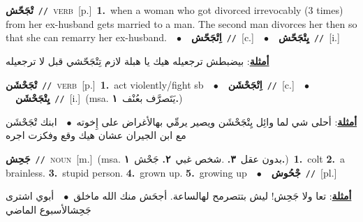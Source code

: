 \documentclass[10pt,a4paper,twoside]{article} %
\begin{document}
\begin{multicols}{2}
{\setlength\topsep{0pt}\textbf{\foreignlanguage{arabic}{تْجَحّش}}\ {\color{gray}\texttt{//}\color{black}}\ \textsc{verb}\ [p.]\ \textbf{1.}~when a woman who got divorced irrevocably (3 times) from her ex-husband gets married to a man. The second man divorces her then so that she can remarry her ex-husband.\ \ $\bullet$\ \ \setlength\topsep{0pt}\textbf{\foreignlanguage{arabic}{اِتْجَحّش}}\ {\color{gray}\texttt{//}\color{black}}\ [c.]\ \ $\bullet$\ \ \setlength\topsep{0pt}\textbf{\foreignlanguage{arabic}{يِتْجَحّش}}\ {\color{gray}\texttt{//}\color{black}}\ [i.]\  \begin{flushright}\color{gray}\foreignlanguage{arabic}{\textbf{\underline{\foreignlanguage{arabic}{أمثلة}}}: بيضبطش ترجعيله هيك يا هبلة لازم تِتْجَحّشي قبل لا ترجعيله}\end{flushright}\color{black}} \vspace{2mm}

{\setlength\topsep{0pt}\textbf{\foreignlanguage{arabic}{تْجَحْشَن}}\ {\color{gray}\texttt{//}\color{black}}\ \textsc{verb}\ [p.]\ \textbf{1.}~act violently/fight sb\ \ $\bullet$\ \ \setlength\topsep{0pt}\textbf{\foreignlanguage{arabic}{اِتْجَحْشَن}}\ {\color{gray}\texttt{//}\color{black}}\ [c.]\ \ $\bullet$\ \ \setlength\topsep{0pt}\textbf{\foreignlanguage{arabic}{يِتْجَحْشَن}}\ {\color{gray}\texttt{//}\color{black}}\ [i.]\ \color{gray}(msa. \foreignlanguage{arabic}{يَتَصرَّف بعُنْف}~\foreignlanguage{arabic}{\textbf{١.}})\color{black}\  \begin{flushright}\color{gray}\foreignlanguage{arabic}{\textbf{\underline{\foreignlanguage{arabic}{أمثلة}}}: أحلى شي لما وائِل يِتْجَحْشَن ويصير يرمِّي بهالأغراض على إِخوته\ $\bullet$\ \  ابنك تْجَحْشَن مع ابن الجيران عشان هيك وقع وفكزت اجره}\end{flushright}\color{black}} \vspace{2mm}

{\setlength\topsep{0pt}\textbf{\foreignlanguage{arabic}{جَحِش}}\ {\color{gray}\texttt{//}\color{black}}\ \textsc{noun}\ [m.]\ \color{gray}(msa. \foreignlanguage{arabic}{بدون عقل}~\foreignlanguage{arabic}{\textbf{٣.}}  .\foreignlanguage{arabic}{شخص غبي}~\foreignlanguage{arabic}{\textbf{٢.}}  \foreignlanguage{arabic}{جَحْش}~\foreignlanguage{arabic}{\textbf{١.}})\color{black}\ \textbf{1.}~colt  \textbf{2.}~a brainless.  \textbf{3.}~stupid person.  \textbf{4.}~grown up.  \textbf{5.}~growing up\ \ $\bullet$\ \ \setlength\topsep{0pt}\textbf{\foreignlanguage{arabic}{جْحُوش}}\ {\color{gray}\texttt{//}\color{black}}\ [pl.]\  \begin{flushright}\color{gray}\foreignlanguage{arabic}{\textbf{\underline{\foreignlanguage{arabic}{أمثلة}}}: تعا ولا جَحِش! ليش بتتصرمح لهالساعة. أجحَش منك الله ماخلق\ $\bullet$\ \  أبوي اشترى جَحِشالأسبوع الماضي}\end{flushright}\color{black}} \vspace{2mm}


\end{multicols}
\end{document}
